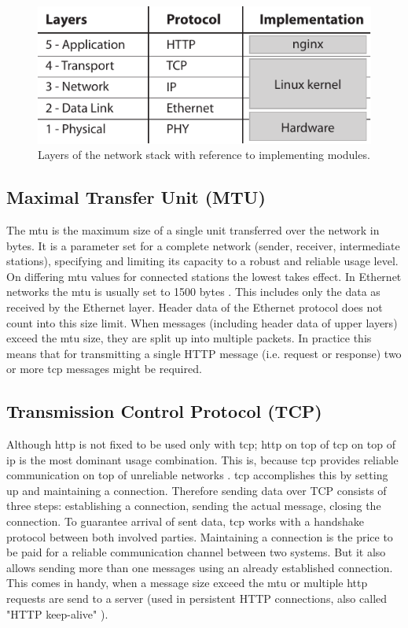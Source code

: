 \begin{figure}[H]
	\centering
	\includegraphics[scale=1]{images/network-layers.pdf}
	\caption{Layers of the network stack with reference to implementing modules.}
	\label{fig:net-layers}
\end{figure}

\subsection{Maximal Transfer Unit (MTU)}
\label{subsec:mtu}

The \gls{mtu} is the maximum size of a single unit transferred over the network in bytes. It is a parameter set for a complete network (sender, receiver, intermediate stations), specifying and limiting its capacity to a robust and reliable usage level. On differing \gls{mtu} values for connected stations the lowest takes effect. In Ethernet networks the \gls{mtu} is usually set to 1500 bytes \cite{kn1}. This includes only the data as received by the Ethernet layer. Header data of  the Ethernet protocol does not count into this size limit. When messages (including header data of upper layers) exceed the \gls{mtu} size, they are split up into multiple packets. In practice this means that for transmitting a single HTTP message (i.e. request or response) two or more \gls{tcp} messages might be required.

\subsection{Transmission Control Protocol (TCP)}

Although \gls{http} is not fixed to be used only with \gls{tcp}; \gls{http} on top of \gls{tcp} on top of \gls{ip} is the most dominant usage combination. This is, because \gls{tcp} provides reliable communication on top of unreliable networks \cite{tcp}. \gls{tcp} accomplishes this by setting up and maintaining a connection. Therefore sending data over TCP consists of three steps: establishing a connection, sending the actual message, closing the connection. To guarantee arrival of sent data, \gls{tcp} works with a handshake protocol between both involved parties. Maintaining a connection is the price to be paid for a reliable communication channel between two systems. But it also allows sending more than one messages using an already established connection. This comes in handy, when a message size exceed the \gls{mtu} or multiple \gls{http} requests are send to a server (used in persistent HTTP connections, also called "HTTP keep-alive" \cite{http}).

